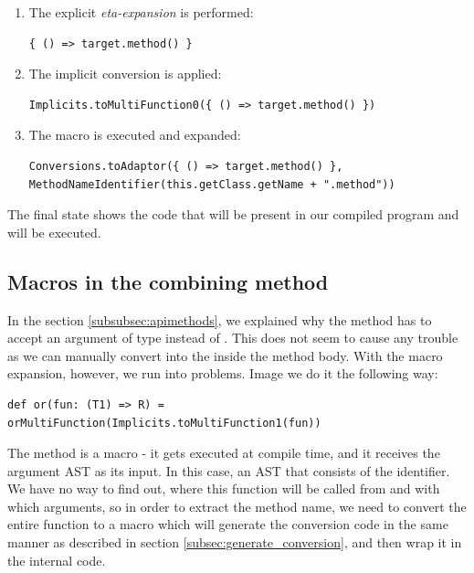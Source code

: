 \begin{enumerate}
	\item The explicit \textit{eta-expansion} is performed:
	\lstset{style=Scala}
	\begin{lstlisting}
{ () => target.method() }
	\end{lstlisting}
	\item The implicit conversion is applied:
		\lstset{style=Scala}
	\begin{lstlisting}
Implicits.toMultiFunction0({ () => target.method() })
		\end{lstlisting}
		\item The macro  is executed and expanded:
		\lstset{style=Scala}
		\begin{lstlisting}
Conversions.toAdaptor({ () => target.method() }, MethodNameIdentifier(this.getClass.getName + ".method"))
		\end{lstlisting}
\end{enumerate}

The final state shows the code that will be present in our compiled program and will be executed.

\subsection{Macros in the combining method}

In the section \ref{subsubsec:apimethods}, we explained why the  method has to accept an argument of  type instead of . This does not seem to cause any trouble as we can manually convert  into the  inside the method body. With the macro expansion, however, we run into problems. Image we do it the following way:
\lstset{style=Scala}
\begin{lstlisting}
def or(fun: (T1) => R) = orMultiFunction(Implicits.toMultiFunction1(fun))
\end{lstlisting}

The   method is a macro - it gets executed at compile time, and it receives the argument AST as its input. In this case, an AST that consists of the  identifier. We have no way to find out, where this function will be called from and with which arguments, so in order to extract the method name, we need to convert the entire  function to a macro which will generate the conversion code in the same manner as described in section \ref{subsec:generate_conversion}, and then wrap it in the internal  code.

